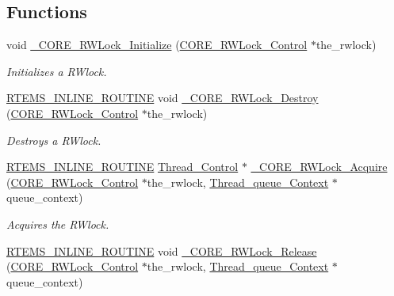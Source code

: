 \subsection*{Functions}
\begin{DoxyCompactItemize}
\item 
void \mbox{\hyperlink{group__RTEMSScoreRWLock_gaa689b4e53215c2f2c0a19f25d531aafb}{\+\_\+\+C\+O\+R\+E\+\_\+\+R\+W\+Lock\+\_\+\+Initialize}} (\mbox{\hyperlink{structCORE__RWLock__Control}{C\+O\+R\+E\+\_\+\+R\+W\+Lock\+\_\+\+Control}} $\ast$the\+\_\+rwlock)
\begin{DoxyCompactList}\small\item\em Initializes a R\+Wlock. \end{DoxyCompactList}\item 
\mbox{\hyperlink{group__RTEMSScoreBaseDefs_gac216239df231d5dbd15e3520b0b9313f}{R\+T\+E\+M\+S\+\_\+\+I\+N\+L\+I\+N\+E\+\_\+\+R\+O\+U\+T\+I\+NE}} void \mbox{\hyperlink{group__RTEMSScoreRWLock_gab26c54e4f7f3c490c4f39eb1fd1d77a6}{\+\_\+\+C\+O\+R\+E\+\_\+\+R\+W\+Lock\+\_\+\+Destroy}} (\mbox{\hyperlink{structCORE__RWLock__Control}{C\+O\+R\+E\+\_\+\+R\+W\+Lock\+\_\+\+Control}} $\ast$the\+\_\+rwlock)
\begin{DoxyCompactList}\small\item\em Destroys a R\+Wlock. \end{DoxyCompactList}\item 
\mbox{\hyperlink{group__RTEMSScoreBaseDefs_gac216239df231d5dbd15e3520b0b9313f}{R\+T\+E\+M\+S\+\_\+\+I\+N\+L\+I\+N\+E\+\_\+\+R\+O\+U\+T\+I\+NE}} \mbox{\hyperlink{struct__Thread__Control}{Thread\+\_\+\+Control}} $\ast$ \mbox{\hyperlink{group__RTEMSScoreRWLock_ga80b56e01077592b6608d7e2a1a6ddd46}{\+\_\+\+C\+O\+R\+E\+\_\+\+R\+W\+Lock\+\_\+\+Acquire}} (\mbox{\hyperlink{structCORE__RWLock__Control}{C\+O\+R\+E\+\_\+\+R\+W\+Lock\+\_\+\+Control}} $\ast$the\+\_\+rwlock, \mbox{\hyperlink{structThread__queue__Context}{Thread\+\_\+queue\+\_\+\+Context}} $\ast$queue\+\_\+context)
\begin{DoxyCompactList}\small\item\em Acquires the R\+Wlock. \end{DoxyCompactList}\item 
\mbox{\hyperlink{group__RTEMSScoreBaseDefs_gac216239df231d5dbd15e3520b0b9313f}{R\+T\+E\+M\+S\+\_\+\+I\+N\+L\+I\+N\+E\+\_\+\+R\+O\+U\+T\+I\+NE}} void \mbox{\hyperlink{group__RTEMSScoreRWLock_ga0441e1bfb6a1316cbf35dccf40dbf920}{\+\_\+\+C\+O\+R\+E\+\_\+\+R\+W\+Lock\+\_\+\+Release}} (\mbox{\hyperlink{structCORE__RWLock__Control}{C\+O\+R\+E\+\_\+\+R\+W\+Lock\+\_\+\+Control}} $\ast$the\+\_\+rwlock, \mbox{\hyperlink{structThread__queue__Context}{Thread\+\_\+queue\+\_\+\+Context}} $\ast$queue\+\_\+context)

\end{DoxyCompactItemize}
